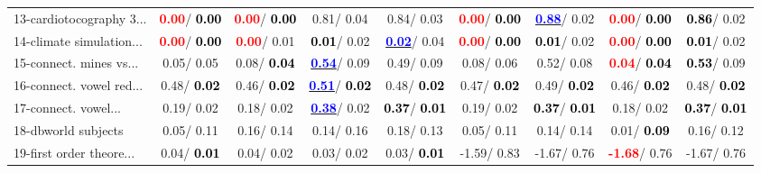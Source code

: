 \begin{table}[h]
\begin{center}
\begin{tabular}{lc|c|c|c|c|c|c|c}
13-cardiotocography 3... & \textcolor{red}{\textbf{  0.00}}/\textcolor{black}{\textbf{  0.00}} & \textcolor{red}{\textbf{  0.00}}/\textcolor{black}{\textbf{  0.00}} &   0.81/  0.04 &   0.84/  0.03 & \textcolor{red}{\textbf{  0.00}}/\textcolor{black}{\textbf{  0.00}} & \underline{\textcolor{blue}{\textbf{  0.88}}}/  0.02 & \textcolor{red}{\textbf{  0.00}}/\textcolor{black}{\textbf{  0.00}} & \textcolor{black}{\textbf{  0.86}}/  0.02 \\
14-climate simulation... & \textcolor{red}{\textbf{  0.00}}/\textcolor{black}{\textbf{  0.00}} & \textcolor{red}{\textbf{  0.00}}/  0.01 & \textcolor{black}{\textbf{  0.01}}/  0.02 & \underline{\textcolor{blue}{\textbf{  0.02}}}/  0.04 & \textcolor{red}{\textbf{  0.00}}/\textcolor{black}{\textbf{  0.00}} & \textcolor{black}{\textbf{  0.01}}/  0.02 & \textcolor{red}{\textbf{  0.00}}/\textcolor{black}{\textbf{  0.00}} & \textcolor{black}{\textbf{  0.01}}/  0.02 \\ \hline
15-connect. mines vs... &   0.05/  0.05 &   0.08/\textcolor{black}{\textbf{  0.04}} & \underline{\textcolor{blue}{\textbf{  0.54}}}/  0.09 &   0.49/  0.09 &   0.08/  0.06 &   0.52/  0.08 & \textcolor{red}{\textbf{  0.04}}/\textcolor{black}{\textbf{  0.04}} & \textcolor{black}{\textbf{  0.53}}/  0.09 \\
16-connect. vowel red... &   0.48/\textcolor{black}{\textbf{  0.02}} &   0.46/\textcolor{black}{\textbf{  0.02}} & \underline{\textcolor{blue}{\textbf{  0.51}}}/\textcolor{black}{\textbf{  0.02}} &   0.48/\textcolor{black}{\textbf{  0.02}} &   0.47/\textcolor{black}{\textbf{  0.02}} &   0.49/\textcolor{black}{\textbf{  0.02}} &   0.46/\textcolor{black}{\textbf{  0.02}} &   0.48/\textcolor{black}{\textbf{  0.02}} \\
17-connect. vowel... &   0.19/  0.02 &   0.18/  0.02 & \underline{\textcolor{blue}{\textbf{  0.38}}}/  0.02 & \textcolor{black}{\textbf{  0.37}}/\textcolor{black}{\textbf{  0.01}} &   0.19/  0.02 & \textcolor{black}{\textbf{  0.37}}/\textcolor{black}{\textbf{  0.01}} &   0.18/  0.02 & \textcolor{black}{\textbf{  0.37}}/\textcolor{black}{\textbf{  0.01}} \\
18-dbworld subjects &   0.05/  0.11 &   0.16/  0.14 &   0.14/  0.16 &   0.18/  0.13 &   0.05/  0.11 &   0.14/  0.14 &   0.01/\textcolor{black}{\textbf{  0.09}} &   0.16/  0.12 \\
19-first order theore... &   0.04/\textcolor{black}{\textbf{  0.01}} &   0.04/  0.02 &   0.03/  0.02 &   0.03/\textcolor{black}{\textbf{  0.01}} &  -1.59/  0.83 &  -1.67/  0.76 & \textcolor{red}{\textbf{ -1.68}}/  0.76 &  -1.67/  0.76 \\

\end{tabular}
\end{center}
\end{table}
